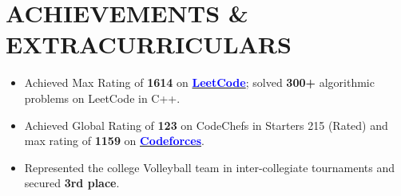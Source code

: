 \documentclass[letterpaper,10pt]{article}
\newcommand{\resumeItem}[1]{
  \item\small{
    {#1 \vspace{-5pt}}
  }
}
\begin{document}
 \section{ACHIEVEMENTS \& EXTRACURRICULARS}
          \begin{itemize}[leftmargin=0.15in]
                \resumeItem{Achieved Max Rating of \textbf{1614} on \href{https://leetcode.com/u/itsneerajkumar/}{\textcolor{blue}{\textbf{{LeetCode}}}}; solved \textbf{300+} algorithmic problems on LeetCode in C++.}
                \vspace{2pt}
                \resumeItem{Achieved Global Rating of \textbf{123} on CodeChefs in Starters 215 (Rated) and max rating of \textbf{1159} on \href{https://codeforces.com/profile/itsneerajkumar}{\textcolor{blue}{\textbf{{Codeforces}}}}.}
                \vspace{2pt}
                \resumeItem{Represented the college Volleyball team in inter-collegiate tournaments and secured \textbf{3rd place}.}
          \end{itemize}
 \vspace{-8pt}

 
 
\end{document}
